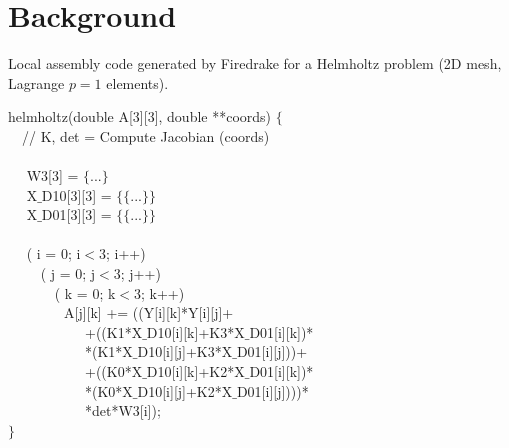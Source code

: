 \documentclass[conference]{IEEEtran}
\begin{document}
\section{Background}
\label{sec:background}
\begin{algorithm}[t]
\small
\caption{Local assembly code generated by Firedrake for a Helmholtz problem (2D mesh, Lagrange $p=1$ elements).}
\label{code:helmholtz}
 helmholtz(double A[3][3], double **coords) $\lbrace$\\
~~// K, det = Compute Jacobian (coords) \\
~~\\
~~ W3[3] = $\lbrace$...$\rbrace$\\
~~ X$\_$D10[3][3] = $\lbrace\lbrace$...$\rbrace\rbrace$\\
~~ X$\_$D01[3][3] = $\lbrace\lbrace$...$\rbrace\rbrace$\\
~~\\
~~ ( i = 0; i$<$3; i++) \\
~~~~ ( j = 0; j$<$3; j++) \\
~~~~~~ ( k = 0; k$<$3; k++) \\
~~~~~~~~A[j][k] += ((Y[i][k]*Y[i][j]+\\
~~~~~~~~~~~+((K1*X$\_$D10[i][k]+K3*X$\_$D01[i][k])*\\
~~~~~~~~~~~*(K1*X$\_$D10[i][j]+K3*X$\_$D01[i][j]))+\\
~~~~~~~~~~~+((K0*X$\_$D10[i][k]+K2*X$\_$D01[i][k])*\\
~~~~~~~~~~~*(K0*X$\_$D10[i][j]+K2*X$\_$D01[i][j])))*\\
~~~~~~~~~~~*det*W3[i]);\\
$\rbrace$
\end{algorithm}
\end{document}
